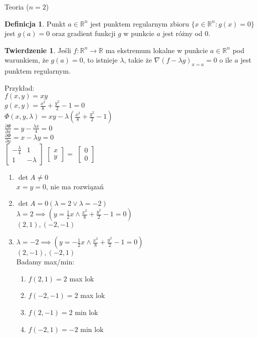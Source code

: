 \documentclass{article}
\theoremstyle{definition}
\newtheorem{de}{Definicja}[subsection]
\theoremstyle{definition}
\newtheorem{tw}{Twierdzenie}[subsection]
\theoremstyle{definition}
\theoremstyle{definition}
\theoremstyle{definition}
\theoremstyle{definition}
\theoremstyle{definition}
\begin{document}
Teoria ($n=2$)
\begin{de}
    Punkt $a\in\mathbb{R}^n$ jest punktem regularnym zbioru $\{x\in\mathbb{R}^n:  g(x)=0\}$ jest $g(a)=0$ oraz gradient funkcji $g$ w punkcie $a$ jest różny od $0$.
\end{de}

\begin{tw}
    Jeśli $f:\mathbb{R}^n\rightarrow\mathbb{R}$ ma ekstremum lokalne w punkcie $a\in\mathbb{R}^n$ pod warunkiem, że $g(a)=0$, to istnieje
    $\lambda$, takie że $\nabla(f - \lambda g)_{x=a} = 0$ o ile $a$ jest punktem regularnym.
\end{tw}

Przykład:\\
$f(x,y)=xy$\\
$g(x,y)=\frac{x^2}{8}+\frac{y^2}{2}-1=0$\\
$\Phi(x,y,\lambda) = xy - \lambda (\frac{x^2}{8} + \frac{y^2}{2}-1)$\\
$\frac{\partial \Phi}{\partial x} = y - \frac{\lambda x}{4} =0$\\
$\frac{\partial \Phi}{\partial y} = x - \lambda y = 0 $\\
$\begin{bmatrix}
-\frac{\lambda}{4} & 1\\
1 & -\lambda
\end{bmatrix}$
$\begin{bmatrix}
    x\\
    y
\end{bmatrix}
=
$
$
\begin{bmatrix}
0\\
0
\end{bmatrix}$\\
\begin{enumerate}
    \item $\det A \neq 0$\\
    $x=y=0$, nie ma rozwiązań
    \item $\det A = 0 \left(\lambda = 2 \lor \lambda = -2\right)$\\
    $\lambda = 2 \implies \left(y=\frac{1}{2} x \land \frac{x^2}{8} + \frac{y^2}{2} - 1 =0\right)$\\
    $\left(2,1\right), \left(-2,-1\right)$\\
    \item $\lambda = -2 \implies \left(y=-\frac{1}{2}x \land \frac{x^2}{8}+\frac{y^2}{2} - 1 = 0\right)$\\
    $\left(2,-1\right), \left(-2,1\right)$\\
    Badamy max/min:
    \begin{enumerate}
        \item $f(2,1)=2$ max lok
        \item $f(-2,-1)=2$ max lok
        \item $f(2,-1)=2$ min lok
        \item $f(-2,1)=-2$ min lok
    \end{enumerate}
\end{enumerate}
\end{document}
